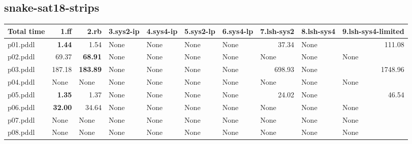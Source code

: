 \documentclass{article}
\begin{document}
\hypertarget{total_time-snake-sat18-strips}{}
\subsection*{snake-sat18-strips}

\begin{tabular}{@{}lrrrrrrrrr@{}}
Total time & 1.ff & 2.rb & 3.sys2-ip & 4.sys4-ip & 5.sys2-lp & 6.sys4-lp & 7.lsh-sys2 & 8.lsh-sys4 & 9.lsh-sys4-limited \\
\midrule
p01.pddl & \textbf{1.44} & 1.54 & \multicolumn{1}{|l|}{None} & \multicolumn{1}{|l|}{None} & \multicolumn{1}{|l|}{None} & \multicolumn{1}{|l|}{None} & 37.34 & \multicolumn{1}{|l|}{None} & 111.08 \\
p02.pddl & 69.37 & \textbf{68.91} & \multicolumn{1}{|l|}{None} & \multicolumn{1}{|l|}{None} & \multicolumn{1}{|l|}{None} & \multicolumn{1}{|l|}{None} & \multicolumn{1}{|l|}{None} & \multicolumn{1}{|l|}{None} & \multicolumn{1}{|l|}{None} \\
p03.pddl & 187.18 & \textbf{183.89} & \multicolumn{1}{|l|}{None} & \multicolumn{1}{|l|}{None} & \multicolumn{1}{|l|}{None} & \multicolumn{1}{|l|}{None} & 698.93 & \multicolumn{1}{|l|}{None} & 1748.96 \\
p04.pddl & \multicolumn{1}{|l|}{None} & \multicolumn{1}{|l|}{None} & \multicolumn{1}{|l|}{None} & \multicolumn{1}{|l|}{None} & \multicolumn{1}{|l|}{None} & \multicolumn{1}{|l|}{None} & \multicolumn{1}{|l|}{None} & \multicolumn{1}{|l|}{None} & \multicolumn{1}{|l|}{None} \\
p05.pddl & \textbf{1.35} & 1.37 & \multicolumn{1}{|l|}{None} & \multicolumn{1}{|l|}{None} & \multicolumn{1}{|l|}{None} & \multicolumn{1}{|l|}{None} & 24.02 & \multicolumn{1}{|l|}{None} & 46.54 \\
p06.pddl & \textbf{32.00} & 34.64 & \multicolumn{1}{|l|}{None} & \multicolumn{1}{|l|}{None} & \multicolumn{1}{|l|}{None} & \multicolumn{1}{|l|}{None} & \multicolumn{1}{|l|}{None} & \multicolumn{1}{|l|}{None} & \multicolumn{1}{|l|}{None} \\
p07.pddl & \multicolumn{1}{|l|}{None} & \multicolumn{1}{|l|}{None} & \multicolumn{1}{|l|}{None} & \multicolumn{1}{|l|}{None} & \multicolumn{1}{|l|}{None} & \multicolumn{1}{|l|}{None} & \multicolumn{1}{|l|}{None} & \multicolumn{1}{|l|}{None} & \multicolumn{1}{|l|}{None} \\
p08.pddl & \multicolumn{1}{|l|}{None} & \multicolumn{1}{|l|}{None} & \multicolumn{1}{|l|}{None} & \multicolumn{1}{|l|}{None} & \multicolumn{1}{|l|}{None} & \multicolumn{1}{|l|}{None} & \multicolumn{1}{|l|}{None} & \multicolumn{1}{|l|}{None} & \multicolumn{1}{|l|}{None} \\

\end{tabular}
\end{document}
